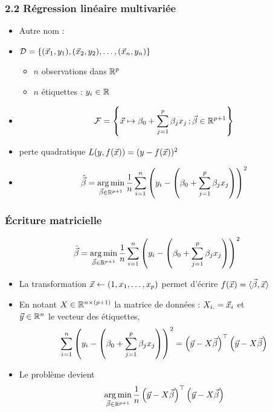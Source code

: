 \begin{frame}
  \frametitle{2.2 Régression linéaire multivariée}
  \begin{itemize}
  \item Autre nom : 
  \item {} $\mathcal{D} = \{(\vec{x}_1, y_1), (\vec{x}_2, y_2), \dots, (\vec{x}_n, y_n)\}$
    \begin{itemize}
    \item $n$ observations dans ${\mathbb R}^p$ 
    \item $n$ étiquettes : $y_i \in {\mathbb R}$
    \end{itemize}
  \item {}
    \[\mathcal{F} = \left\{ \vec{x} \mapsto \beta_0 + \sum_{j=1}^p \beta_j x_j \, ;  \vec{\beta} \in {\mathbb R}^{p+1} \right\}\]
    \pause
    \vspace{-1em}
  \item {} perte quadratique $L(y, f(\vec{x})) = (y - f(\vec{x}))^2$
    \pause
  \item {}
    \[ \hat{\vec{\beta}} = \operatorname*{arg\,min}_{\vec{\beta} \in {\mathbb R}^{p+1}} \frac1n \sum_{i=1}^n \left(y_i - \left(\beta_0 + \sum_{j=1}^p \beta_j x_j\right)\right)^2 \]
  \end{itemize}
\end{frame}

\begin{frame}
  \frametitle{Écriture matricielle}
  \small
    \[ \hat{\vec{\beta}} = \operatorname*{arg\,min}_{\vec{\beta} \in {\mathbb R}^{p+1}} \frac1n \sum_{i=1}^n \left(y_i - \left(\beta_0 + \sum_{j=1}^p \beta_j x_j\right)\right)^2 \]
  \begin{itemize}
  \item La transformation 
    $\vec{x} \leftarrow (1, x_1, \dots, x_p)$ permet d'écrire $f(\vec{x}) = \langle \vec{\beta}, \vec{x} \rangle$ 
  \item En notant $X \in {\mathbb R}^{n \times (p+1)}$ la matrice de données : $X_{i.} = \vec{x}_i$ et \\
    $\vec{y} \in {\mathbb R}^n$ le vecteur des étiquettes,
    \[\sum_{i=1}^n \left(y_i - \left(\beta_0 + \sum_{j=1}^p \beta_j x_j\right)\right)^2 =
    \left(\vec{y} - X \vec{\beta} \right)^\top \left(\vec{y} - X \vec{\beta} \right)\]
\item Le problème devient 
    \[\operatorname*{arg\,min}_{\vec{\beta} \in {\mathbb R}^{p+1}} \frac1n 
    \left(\vec{y} - X \vec{\beta} \right)^\top \left(\vec{y} - X \vec{\beta} \right)\]
  \end{itemize}
\end{frame}


